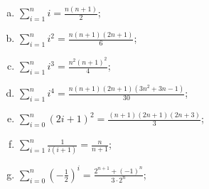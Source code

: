 \begin{problem}
\begin{enumerate}[a)]
  \item
    $\sum^n_{i=1}i = \frac{n(n+1)}{2}$;
  \item
    $\sum^n_{i=1}i^2 = \frac{n(n+1)(2n+1)}{6}$;
  \item
    $\sum^n_{i=1}i^3 = \frac{n^2(n+1)^2}{4}$;
  \item
    $\sum^n_{i=1}i^4 = \frac{n(n+1)(2n+1)(3n^2+3n-1)}{30}$;
  \item
    $\sum^n_{i=0}(2i+1)^2 = \frac{(n+1)(2n+1)(2n+3)}{3}$;
  \item
    $\sum^n_{i=1}\frac{1}{i(i+1)} = \frac{n}{n+1}$;
  \item
    $\sum^n_{i=0}(-\frac{1}{2})^i = \frac{2^{n+1}+(-1)^n}{3\cdot 2^n}$;

  \end{enumerate}
\end{problem}

    
